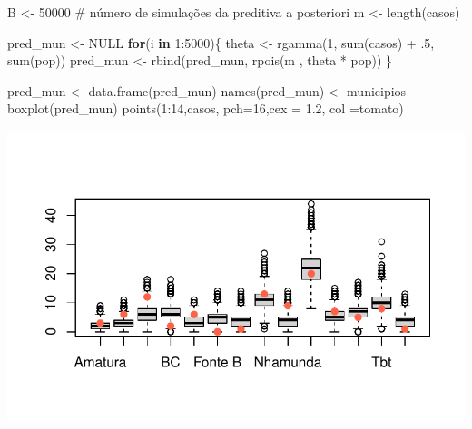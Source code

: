 \documentclass[
  letterpaper,
  DIV=11,
  numbers=noendperiod]{scrreprt}
\newenvironment{Shaded}{\begin{snugshade}}{\end{snugshade}}
\newcommand{\AttributeTok}[1]{\textcolor[rgb]{0.40,0.45,0.13}{#1}}
\newcommand{\CommentTok}[1]{\textcolor[rgb]{0.37,0.37,0.37}{#1}}
\newcommand{\ConstantTok}[1]{\textcolor[rgb]{0.56,0.35,0.01}{#1}}
\newcommand{\ControlFlowTok}[1]{\textcolor[rgb]{0.00,0.23,0.31}{\textbf{#1}}}
\newcommand{\DecValTok}[1]{\textcolor[rgb]{0.68,0.00,0.00}{#1}}
\newcommand{\FloatTok}[1]{\textcolor[rgb]{0.68,0.00,0.00}{#1}}
\newcommand{\FunctionTok}[1]{\textcolor[rgb]{0.28,0.35,0.67}{#1}}
\newcommand{\NormalTok}[1]{\textcolor[rgb]{0.00,0.23,0.31}{#1}}
\newcommand{\OtherTok}[1]{\textcolor[rgb]{0.00,0.23,0.31}{#1}}
\newcommand{\SpecialCharTok}[1]{\textcolor[rgb]{0.37,0.37,0.37}{#1}}
\newcommand{\StringTok}[1]{\textcolor[rgb]{0.13,0.47,0.30}{#1}}
\theoremstyle{definition}
\theoremstyle{definition}
\theoremstyle{plain}
\theoremstyle{remark}
\begin{document}
\begin{Shaded}
\begin{Highlighting}[]
\NormalTok{B }\OtherTok{\textless{}{-}} \DecValTok{50000} \CommentTok{\# número de simulações da preditiva a posteriori}
\NormalTok{m }\OtherTok{\textless{}{-}} \FunctionTok{length}\NormalTok{(casos)}

\NormalTok{pred\_mun }\OtherTok{\textless{}{-}} \ConstantTok{NULL}
\ControlFlowTok{for}\NormalTok{(i }\ControlFlowTok{in} \DecValTok{1}\SpecialCharTok{:}\DecValTok{5000}\NormalTok{)\{}
\NormalTok{  theta }\OtherTok{\textless{}{-}} \FunctionTok{rgamma}\NormalTok{(}\DecValTok{1}\NormalTok{, }\FunctionTok{sum}\NormalTok{(casos) }\SpecialCharTok{+}\NormalTok{ .}\DecValTok{5}\NormalTok{, }\FunctionTok{sum}\NormalTok{(pop))}
\NormalTok{  pred\_mun }\OtherTok{\textless{}{-}} \FunctionTok{rbind}\NormalTok{(pred\_mun, }\FunctionTok{rpois}\NormalTok{(m , theta }\SpecialCharTok{*}\NormalTok{ pop))}
\NormalTok{\}}

\NormalTok{pred\_mun }\OtherTok{\textless{}{-}} \FunctionTok{data.frame}\NormalTok{(pred\_mun)}
\FunctionTok{names}\NormalTok{(pred\_mun) }\OtherTok{\textless{}{-}}\NormalTok{ municipios}
\FunctionTok{boxplot}\NormalTok{(pred\_mun)}
\FunctionTok{points}\NormalTok{(}\DecValTok{1}\SpecialCharTok{:}\DecValTok{14}\NormalTok{,casos, }\AttributeTok{pch=}\DecValTok{16}\NormalTok{,}\AttributeTok{cex =} \FloatTok{1.2}\NormalTok{, }\AttributeTok{col =}\StringTok{\textquotesingle{}tomato\textquotesingle{}}\NormalTok{)}
\end{Highlighting}
\end{Shaded}

\includegraphics{poisson_files/figure-pdf/unnamed-chunk-3-1.pdf}
\end{document}
